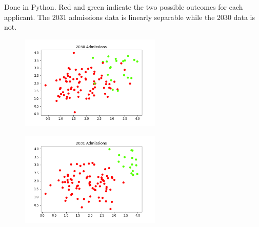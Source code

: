 \documentclass[newpage]{homework}
\begin{document}
\question
\begin{alphaparts}
    \questionpart Done in Python. Red and green indicate the two possible outcomes for each applicant. The 2031 admissions data is linearly separable while the 2030 data is not.
    \begin{figure}[h]
        \centering
        \includegraphics[width=0.6\textwidth]{5ai.png}
    \end{figure}
    \begin{figure}[h]
        \centering
        \includegraphics[width=0.6\textwidth]{5aii.png}
    \end{figure}


\end{alphaparts}
\end{document}
